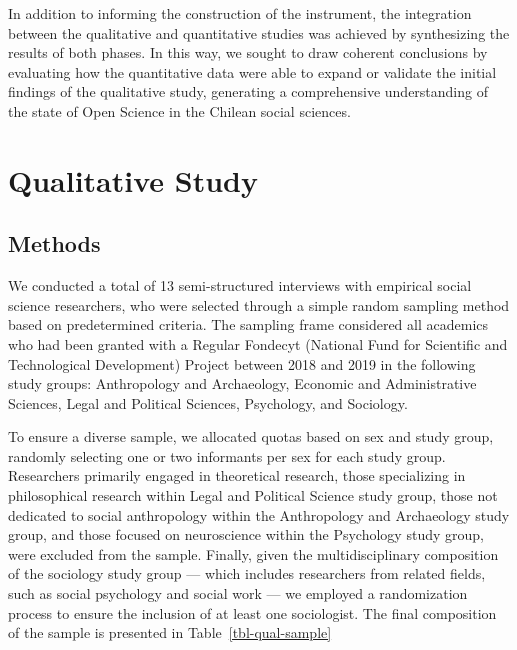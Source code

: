 \documentclass[
  letterpaper,
  DIV=11,
  numbers=noendperiod]{scrartcl}
\begin{document}
In addition to informing the construction of the instrument, the
integration between the qualitative and quantitative studies was
achieved by synthesizing the results of both phases. In this way, we
sought to draw coherent conclusions by evaluating how the quantitative
data were able to expand or validate the initial findings of the
qualitative study, generating a comprehensive understanding of the state
of Open Science in the Chilean social sciences.

\hypertarget{qualitative-study}{%
\section{Qualitative Study}\label{qualitative-study}}

\hypertarget{methods}{%
\subsection{Methods}\label{methods}}

We conducted a total of 13 semi-structured interviews with empirical
social science researchers, who were selected through a simple random
sampling method based on predetermined criteria. The sampling frame
considered all academics who had been granted with a Regular Fondecyt
(National Fund for Scientific and Technological Development) Project
between 2018 and 2019 in the following study groups: Anthropology and
Archaeology, Economic and Administrative Sciences, Legal and Political
Sciences, Psychology, and Sociology.

To ensure a diverse sample, we allocated quotas based on sex and study
group, randomly selecting one or two informants per sex for each study
group. Researchers primarily engaged in theoretical research, those
specializing in philosophical research within Legal and Political
Science study group, those not dedicated to social anthropology within
the Anthropology and Archaeology study group, and those focused on
neuroscience within the Psychology study group, were excluded from the
sample. Finally, given the multidisciplinary composition of the
sociology study group --- which includes researchers from related
fields, such as social psychology and social work --- we employed a
randomization process to ensure the inclusion of at least one
sociologist. The final composition of the sample is presented in
Table~\ref{tbl-qual-sample}
\end{document}

